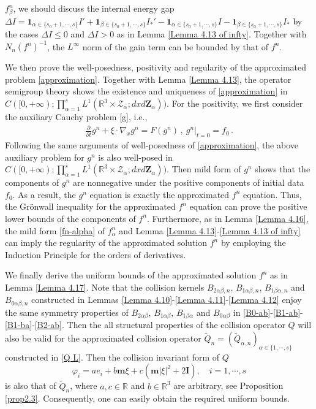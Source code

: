 \documentclass[reqno,11pt]{amsart}
\numberwithin{equation}{section}
\def\R{\mathbb{R}}
\begin{document}
$f^n_\beta$, we should discuss the internal energy gap $\Delta I = \mathbf{1}_{ \alpha \in \{ s_0 + 1, \cdots, s \} } I' + \mathbf{1}_{ \beta \in \{ s_0 + 1, \cdots, s \} }  I_*' - \mathbf{1}_{ \alpha \in \{ s_0 + 1, \cdots, s \} } I - \mathbf{1}_{ \beta \in \{ s_0 + 1, \cdots, s \} }  I_* $ by the cases $\Delta I \leq 0$ and $\Delta I > 0$ as in Lemma \ref{Lemma 4.13 of infty}. Together with $N_n (f^n)^{-1}$, the $L^\infty$ norm of the gain term can be bounded by that of $f^n$.

We then prove the well-posedness, positivity and regularity of the approximated problem \eqref{approximation}. Together with Lemma \ref{Lemma 4.13}, the operator semigroup theory shows the existence and uniqueness of \eqref{approximation} in $ C ( [0, + \infty); \prod_{\alpha = 1}^{s} L^1 (\R^3 \times \mathcal{Z}_\alpha; d x d \mathbf{Z}_\alpha) ) $. For the positivity, we first consider the auxiliary Cauchy problem \eqref{g}, i.e.,
\begin{equation*}
  \begin{aligned}
    \tfrac{\partial}{\partial t} g^n + \xi \cdot \nabla_x g^n = F (g^n) \,, \ g^n |_{t = 0} = f_0 \,.
  \end{aligned}
\end{equation*}
Following the same arguments of well-posedness of \eqref{approximation}, the above auxiliary problem for $g^n$ is also well-posed in $ C ( [0, + \infty); \prod_{\alpha = 1}^{s} L^1 (\R^3 \times \mathcal{Z}_\alpha; d x d \mathbf{Z}_\alpha) ) $. Then mild form of $g^n$ shows that the components of $g^n$ are nonnegative under the positive components of initial data $f_0$. As a result, the $g^n$ equation is exactly the approximated $f^n$ equation. Thus, the Gr\"onwall inequality for the approximated $f^n$ equation can prove the positive lower bounds of the components of $f^n$. Furthermore, as in Lemma \ref{Lemma 4.16}, the mild form \eqref{fn-alpha} of $f^n_\alpha$ and Lemma \ref{Lemma 4.13}-\ref{Lemma 4.13 of infty} can imply the regularity of the approximated solution $f^n$ by employing the Induction Principle for the orders of derivatives.

We finally derive the uniform bounds of the approximated solution $f^n$ as in Lemma \ref{Lemma 4.17}. Note that the collision kernels $B_{2 \alpha \beta ,n}$, $B_{1 \alpha \beta, n}$, $B_{1 \beta \alpha, n}$ and $B_{0 \alpha \beta, n}$ constructed in Lemmas \ref{Lemma 4.10}-\ref{Lemma 4.11}-\ref{Lemma 4.12} enjoy the same symmetry properties of $B_{2 \alpha \beta }$, $B_{1 \alpha \beta}$, $B_{1 \beta \alpha}$ and $B_{0 \alpha \beta}$ in \eqref{B0-ab}-\eqref{B1-ab}-\eqref{B1-ba}-\eqref{B2-ab}. Then the all structural properties of the collision operator $Q$ will also be valid for the approximated collision operator $\tilde{Q}_n = ( \tilde{Q}_{\alpha, n} )_{ \alpha \in \{ 1, \cdots, s \} }$ constructed in \eqref{Q L}. Then the collision invariant form of $Q$
	\begin{equation*}
		\varphi_i= ae_i + b \mathbf{m} \xi +c (\mathbf{m} |\xi|^2+2\mathbf{I}),\quad i=1,\cdots,s 
	\end{equation*}
is also that of $\tilde{Q}_n$, where $a,c\in \R $ and $ b\in \R^3$ are arbitrary, see Proposition \ref{prop2.3}. Consequently, one can easily obtain the required uniform bounds.
\end{document}
